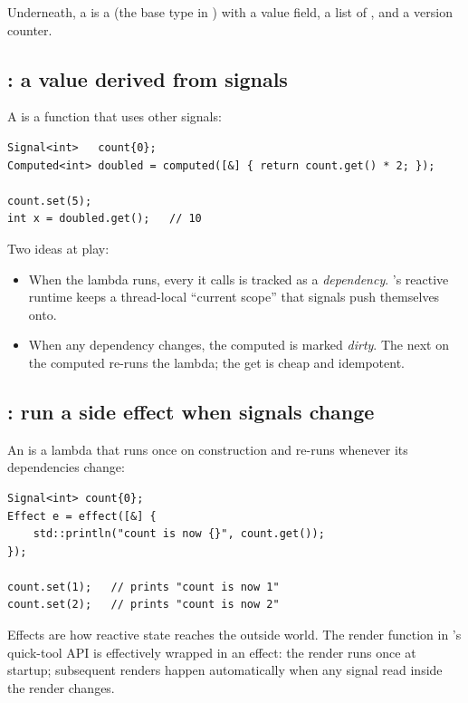 Underneath, a  is a  (the base type
in ) with a value field, a
list of , and a version counter.

\subsection{: a value derived from signals}

A  is a function that uses other signals:

\begin{lstlisting}
Signal<int>   count{0};
Computed<int> doubled = computed([&] { return count.get() * 2; });

count.set(5);
int x = doubled.get();   // 10
\end{lstlisting}

Two ideas at play:

\begin{itemize}[leftmargin=*]
  \item When the lambda runs, every  it calls is tracked
    as a \emph{dependency}. \maya{}'s reactive runtime keeps a
    thread-local ``current scope'' that signals push themselves
    onto.
  \item When any dependency changes, the computed is marked
    \emph{dirty}. The next  on the computed re-runs the
    lambda; the get is cheap and idempotent.
\end{itemize}

\subsection{: run a side effect when signals change}

An  is a lambda that runs once on construction and
re-runs whenever its dependencies change:

\begin{lstlisting}
Signal<int> count{0};
Effect e = effect([&] {
    std::println("count is now {}", count.get());
});

count.set(1);   // prints "count is now 1"
count.set(2);   // prints "count is now 2"
\end{lstlisting}

Effects are how reactive state reaches the outside world. The render
function in \maya{}'s  quick-tool
API is effectively wrapped in an effect: the render runs once at
startup; subsequent renders happen automatically when any signal
read inside the render changes.

